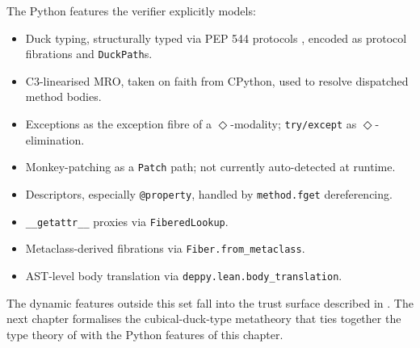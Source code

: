 The Python features the verifier explicitly models:
\begin{itemize}[leftmargin=1.7em]
  \item Duck typing, structurally typed via PEP 544 protocols
    \citep{PEP544}, encoded as protocol fibrations and
    \verb|DuckPath|s.
  \item C3-linearised MRO, taken on faith from CPython, used to
    resolve dispatched method bodies.
  \item Exceptions as the exception fibre of a $\Diamond$-modality;
    \texttt{try/except} as $\Diamond$-elimination.
  \item Monkey-patching as a \verb|Patch| path; not currently
    auto-detected at runtime.
  \item Descriptors, especially \verb|@property|, handled by
    \verb|method.fget| dereferencing.
  \item \verb|__getattr__| proxies via \verb|FiberedLookup|.
  \item Metaclass-derived fibrations via \verb|Fiber.from_metaclass|.
  \item AST-level body translation via \verb|deppy.lean.body_translation|.
\end{itemize}

The dynamic features outside this set fall into the trust surface
described in .  The next chapter formalises the
cubical-duck-type metatheory that ties together the type theory of
 with the Python features of this chapter.
